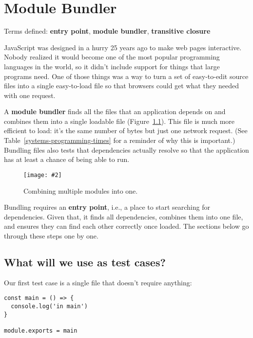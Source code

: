 \documentclass[krantzl]{krantz}
\newcommand{\figpdf}[4]{\begin{figure}%
\centering%
\texttt{[image: \#2]}%
\caption{#3}%
\label{#1}%
\end{figure}}
\newcommand{\figref}[1]{Figure~\ref{#1}}
\newcommand{\tblref}[1]{Table~\ref{#1}}
\newcommand{\glossref}[1]{\textbf{#1}}
\begin{document}
\chapter{Module Bundler}\label{module-bundler}


\noindent 
  Terms defined: \glossref{entry point}, \glossref{module bundler}, \glossref{transitive closure}



JavaScript was designed in a hurry 25 years ago to make web pages interactive.
Nobody realized it would become one of the most popular programming languages in the world,
so it didn’t include support for things that large programs need.
One of those things was a way to turn a set of easy-to-edit source files
into a single easy-to-load file
so that browsers could get what they needed with one request.


A \glossref{module bundler}
finds all the files that an application depends on
and combines them into a single loadable file
(\figref{module-bundler-bundling}).
This file is much more efficient to load:
it’s the same number of bytes but just one network request.
(See \tblref{systems-programming-times} for a reminder of why this is important.)
Bundling files also tests that dependencies actually resolve
so that the application has at least a chance of being able to run.

\figpdf{module-bundler-bundling}{./module-bundler/bundling.pdf}{Combining multiple modules into one.}{0.6}


Bundling requires an \glossref{entry point},
i.e.,
a place to start searching for dependencies.
Given that,
it finds all dependencies,
combines them into one file,
and ensures they can find each other correctly once loaded.
The sections below go through these steps one by one.

\section{What will we use as test cases?}\label{module-bundler-tests}


Our first test case is a single file that doesn’t require anything:


\begin{lstlisting}[frame=tblr]
const main = () => {
  console.log('in main')
}

module.exports = main
\end{lstlisting}
\end{document}
